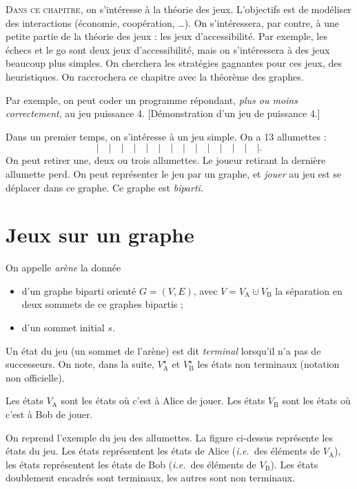 \lettrine{D}{ans ce chapitre}, on s'intéresse à la théorie des jeux.
L'objectifs est de modéliser des interactions (économie, coopération, \ldots).
On s'intéressera, par contre, à une petite partie de la théorie des jeux : les jeux d'accessibilité.
Par exemple, les échecs et le go sont deux jeux d'accessibilité, mais on s'intéressera à des jeux beaucoup plus simples.
On cherchera les stratégies gagnantes pour ces jeux, des heuristiques.
On raccrochera ce chapitre avec la théorème des graphes.

Par exemple, on peut coder un programme répondant, \textit{plus ou moins correctement}, au jeu puissance 4. [Démonstration d'un jeu de puissance 4.]


Dans un premier temps, on s'intéresse à un jeu simple. On a 13 allumettes : \[
	|\quad|\quad|\quad|\quad|\quad|\quad|\quad|\quad|\quad|\quad|\quad|\quad|\quad|
.\]
On peut retirer une, deux ou trois allumettes. Le joueur retirant la dernière allumette perd.
On peut représenter le jeu par un graphe, et \textit{jouer} au jeu est se déplacer dans ce graphe. Ce graphe est \textit{biparti}.

\section{Jeux sur un graphe}

\begin{defn}
	On appelle \textit{arène} la donnée
	\begin{itemize}
		\item d'un graphe biparti orienté $G = (V, E)$, avec $V = V_\mathrm{A} \cupdot V_\mathrm{B}$\/ la séparation en deux sommets de ce graphes bipartis ;
		\item d'un sommet initial $s$.
	\end{itemize}
\end{defn}

\begin{defn}
	Un état du jeu (un sommet de l'arène) est dit \textit{terminal} lorsqu'il n'a pas de successeurs. On note, dans la suite, $V_\mathrm{A}^\star$\/ et $V_\mathrm{B}^\star$\/ les états non terminaux (notation non officielle).
\end{defn}

\begin{rmk}
	Les états $V_\mathrm{A}$\/ sont les états où c'est à Alice de jouer.
	Les états $V_\mathrm{B}$\/ sont les états où c'est à Bob de jouer.
\end{rmk}

\begin{exm}
	On reprend l'exemple du jeu des allumettes. La figure ci-dessus représente les états du jeu. Les états
	{}
	représentent les états de Alice (\textit{i.e.}\ des éléments de $V_\mathrm{A}$), les états
	{}
	représentent les états de Bob (\textit{i.e.}\ des éléments de $V_\mathrm{B}$).
	Les états doublement encadrés sont terminaux, les autres sont non terminaux.
\end{exm}

